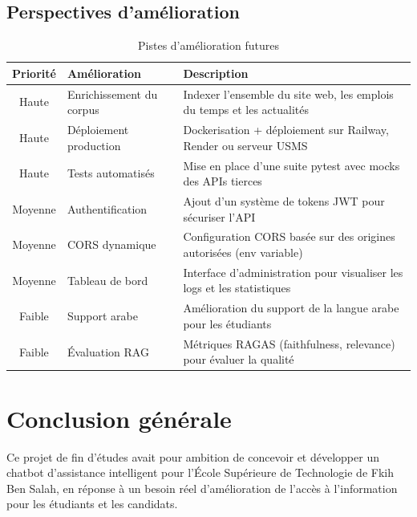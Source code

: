 \documentclass[12pt, a4paper, twoside]{report}
\begin{document}
\section{Perspectives d'amélioration}

\begin{table}[H]
\centering
\caption{Pistes d'amélioration futures}
\label{tab:perspectives}
\begin{tabularx}{\textwidth}{c l X}
\toprule
\rowcolor{primary!10}
\textbf{Priorité} & \textbf{Amélioration} & \textbf{Description} \\
\midrule
Haute & Enrichissement du corpus & Indexer l'ensemble du site web, les emplois du temps et les actualités \\
Haute & Déploiement production & Dockerisation + déploiement sur Railway, Render ou serveur USMS \\
Haute & Tests automatisés & Mise en place d'une suite pytest avec mocks des APIs tierces \\
Moyenne & Authentification & Ajout d'un système de tokens JWT pour sécuriser l'API \\
Moyenne & CORS dynamique & Configuration CORS basée sur des origines autorisées (env variable) \\
Moyenne & Tableau de bord & Interface d'administration pour visualiser les logs et les statistiques \\
Faible & Support arabe & Amélioration du support de la langue arabe pour les étudiants \\
Faible & Évaluation RAG & Métriques RAGAS (faithfulness, relevance) pour évaluer la qualité \\
\bottomrule
\end{tabularx}
\end{table}

\cleardoublepage

\chapter*{Conclusion générale}

Ce projet de fin d'études avait pour ambition de concevoir et développer un chatbot d'assistance intelligent pour l'École Supérieure de Technologie de Fkih Ben Salah, en réponse à un besoin réel d'amélioration de l'accès à l'information pour les étudiants et les candidats.
\end{document}
